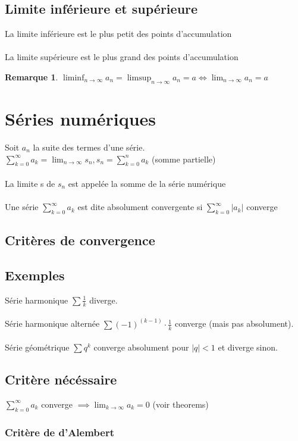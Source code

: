 \documentclass{article}
\newtheorem{remark}{Remarque}[section]
\begin{document}
\subsection{Limite inférieure et supérieure}
La limite inférieure est le plus petit des points d'accumulation \\\\
La limite supérieure est le plus grand des points d'accumulation
\begin{remark}
    $\liminf_{n\to\infty}a_n = \limsup_{n\to\infty}a_n = a \Leftrightarrow \lim_{n\to\infty}a_n = a$
\end{remark}

\section{Séries numériques}

Soit $ a_n $ la suite des termes d'une série. \\
$\sum_{k=0}^{\infty}a_k = \lim_{n\to\infty}s_n, s_n = \sum_{k=0}^{n}a_k$ (somme partielle) \\\\
La limite s de $s_n$ est appelée la somme de la série numérique \\\\
Une série $\sum_{k=0}^{\infty}a_k $ est dite absolument convergente si $\sum_{k=0}^{\infty}|a_k| $ converge
\subsection{Critères de convergence}

\subsection{Exemples}

Série harmonique $ \sum \frac{1}{k} $ diverge.\\\\
Série harmonique alternée $ \sum (-1)^{(k-1)} \cdot \frac{1}{k} $ converge (mais pas absolument).\\\\
Série géométrique $\sum q^k $ converge absolument pour $ |q| < 1 $ et diverge sinon.

\subsection{Critère nécéssaire}
$\sum_{k=0}^{\infty}a_k$ converge $\implies \lim_{k\to\infty}a_k = 0$ (voir theorems)
\subsubsection{Critère de d'Alembert}
\end{document}
